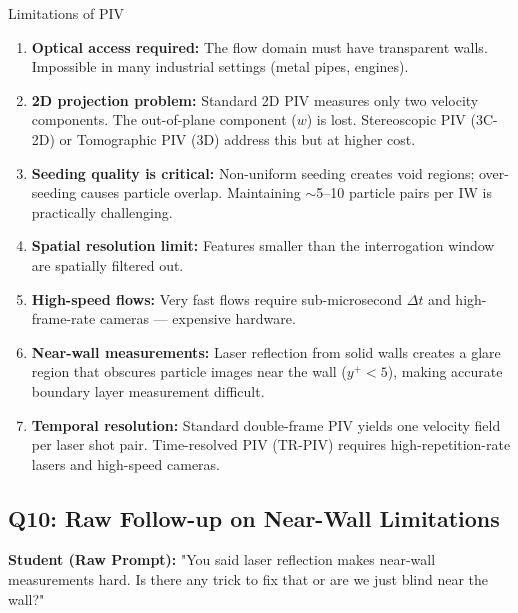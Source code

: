 \documentclass[12pt,a4paper]{article}
\begin{document}
\begin{answerbox}

\begin{warningbox}{Limitations of PIV}
\begin{enumerate}[leftmargin=1.5em]
    \item \textbf{\color{accentred}Optical access required:} The flow domain must have transparent walls. Impossible in many industrial settings (metal pipes, engines).
    \item \textbf{\color{accentred}2D projection problem:} Standard 2D PIV measures only two velocity components. The out-of-plane component ($w$) is lost. Stereoscopic PIV (3C-2D) or Tomographic PIV (3D) address this but at higher cost.
    \item \textbf{\color{accentred}Seeding quality is critical:} Non-uniform seeding creates void regions; over-seeding causes particle overlap. Maintaining $\sim$5--10 particle pairs per IW is practically challenging.
    \item \textbf{\color{accentred}Spatial resolution limit:} Features smaller than the interrogation window are spatially filtered out.
    \item \textbf{\color{accentred}High-speed flows:} Very fast flows require sub-microsecond $\Delta t$ and high-frame-rate cameras --- expensive hardware.
    \item \textbf{\color{accentred}Near-wall measurements:} Laser reflection from solid walls creates a glare region that obscures particle images near the wall ($y^+ < 5$), making accurate boundary layer measurement difficult.
    \item \textbf{\color{accentred}Temporal resolution:} Standard double-frame PIV yields one velocity field per laser shot pair. Time-resolved PIV (TR-PIV) requires high-repetition-rate lasers and high-speed cameras.
\end{enumerate}
\end{warningbox}

\end{answerbox}

\subsection{Q10: Raw Follow-up on Near-Wall Limitations}

\textbf{Student (Raw Prompt):} "You said laser reflection makes near-wall measurements hard. Is there any trick to fix that or are we just blind near the wall?"
\end{document}

